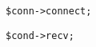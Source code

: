\begin{shaded}
\begin{verbatim}
$conn->connect;
\end{verbatim}
\end{shaded}

\begin{shaded}
\begin{verbatim}
$cond->recv;
\end{verbatim}
\end{shaded}

